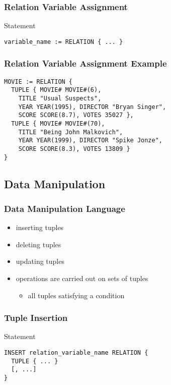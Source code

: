 \documentclass[dvipsnames]{beamer}
\theoremstyle{plain}
\begin{document}
\begin{frame}[fragile]
  \frametitle{Relation Variable Assignment}

  \begin{block}{Statement}
    \begin{lstlisting}
variable_name := RELATION { ... }
    \end{lstlisting}
  \end{block}
\end{frame}

\begin{frame}[fragile]
  \frametitle{Relation Variable Assignment Example}

  \begin{example}
    \begin{lstlisting}
MOVIE := RELATION {
  TUPLE { MOVIE# MOVIE#(6),
    TITLE "Usual Suspects",
    YEAR YEAR(1995), DIRECTOR "Bryan Singer",
    SCORE SCORE(8.7), VOTES 35027 },
  TUPLE { MOVIE# MOVIE#(70),
    TITLE "Being John Malkovich",
    YEAR YEAR(1999), DIRECTOR "Spike Jonze",
    SCORE SCORE(8.3), VOTES 13809 }
}
    \end{lstlisting}
  \end{example}
\end{frame}

\subsection{Data Manipulation}

\begin{frame}
  \frametitle{Data Manipulation Language}

  \begin{itemize}
    \item inserting tuples
    \item deleting tuples
    \item updating tuples

    \pause
    \bigskip
    \item operations are carried out on sets of tuples
    \begin{itemize}
      \item all tuples satisfying a condition
    \end{itemize}
  \end{itemize}
\end{frame}

\begin{frame}[fragile]
  \frametitle{Tuple Insertion}

  \begin{block}{Statement}
    \begin{lstlisting}
INSERT relation_variable_name RELATION {
  TUPLE { ... }
  [, ...]
}
    \end{lstlisting}
  \end{block}
\end{frame}
\end{document}
